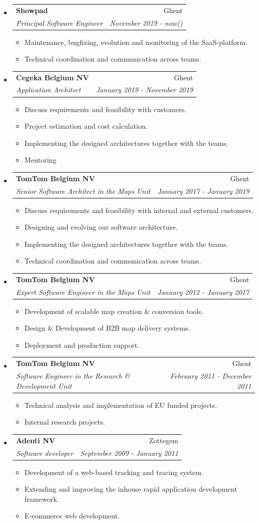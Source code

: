 \documentclass[letterpaper,11pt]{article}
\makeatletter
\newcommand{\resitem}[1]{\item #1 \vspace{-2pt}}
\newcommand{\ressubheading}[4]{
	\begin{tabular*}{6.5in}{l@{\extracolsep{\fill}}r}
		\textbf{#1} & #2 \\
		\textit{#3} & \textit{#4} \\
	\end{tabular*}\vspace{-6pt}}
\makeatother
\begin{document}
\begin{itemize}
	
	\item
	\ressubheading{Showpad}{Ghent}{Principal Software Engineer}{November 2019 - now()}
	\begin{itemize}
		\resitem{Maintenance, bugfixing, evolution and monitoring of the SaaS-platform.}
		\resitem{Technical coordination and communication across teams.}
	\end{itemize}
	
	\item
	\ressubheading{Cegeka Belgium NV}{Ghent}{Application Architect}{January 2019 - November 2019}
	\begin{itemize}
		\resitem{Discuss requirements and feasibility with customers.}		
		\resitem{Project estimation and cost calculation.}	
		\resitem{Implementing the designed architectures together with the teams.}
		\resitem{Mentoring}
	\end{itemize}
	
	\item
	\ressubheading{TomTom Belgium NV}{Ghent}{Senior Software Architect in the Maps Unit}{January 2017 - January 2019}
	\begin{itemize}
		\resitem{Discuss requirements and feasibility with internal and external customers.}		
		\resitem{Designing and evolving our software architecture.}	
		\resitem{Implementing the designed architectures together with the teams.}
		\resitem{Technical coordination and communication across teams.}
	\end{itemize}
	
	\item
	\ressubheading{TomTom Belgium NV}{Ghent}{Expert Software Engineer in the Maps Unit}{January 2012 - January 2017}
	\begin{itemize}
		\resitem{Development of scalable map creation \& conversion tools.}
		\resitem{Design \& Development of B2B map delivery systems.}
		\resitem{Deployment and production support.}
	\end{itemize}
	
	\item
	\ressubheading{TomTom Belgium NV}{Ghent}{Software Engineer in the Research \& Development Unit}{February 2011 - December 2011}
	\begin{itemize}
		\resitem{Technical analysis and implementation of EU funded projects.}
		\resitem{Internal research projects.}
	\end{itemize}
	
	\item 
	\ressubheading{Adenti NV}{Zottegem}{Software developer}{September 2009 - January 2011}
	\begin{itemize}
		\resitem{Development of a web-based tracking and tracing system.}
		\resitem{Extending and improving the inhouse rapid application development framework.}
		\resitem{E-commerce web development.}
	\end{itemize}
	
\end{itemize}
	
\end{document}
